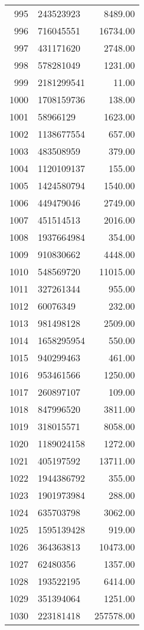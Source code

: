 \begin{table}[ht]
\begin{tabular}{rlr}
  995 & 243523923 & 8489.00 \\ 
  996 & 716045551 & 16734.00 \\ 
  997 & 431171620 & 2748.00 \\ 
  998 & 578281049 & 1231.00 \\ 
  999 & 2181299541 & 11.00 \\ 
  1000 & 1708159736 & 138.00 \\ 
  1001 & 58966129 & 1623.00 \\ 
  1002 & 1138677554 & 657.00 \\ 
  1003 & 483508959 & 379.00 \\ 
  1004 & 1120109137 & 155.00 \\ 
  1005 & 1424580794 & 1540.00 \\ 
  1006 & 449479046 & 2749.00 \\ 
  1007 & 451514513 & 2016.00 \\ 
  1008 & 1937664984 & 354.00 \\ 
  1009 & 910830662 & 4448.00 \\ 
  1010 & 548569720 & 11015.00 \\ 
  1011 & 327261344 & 955.00 \\ 
  1012 & 60076349 & 232.00 \\ 
  1013 & 981498128 & 2509.00 \\ 
  1014 & 1658295954 & 550.00 \\ 
  1015 & 940299463 & 461.00 \\ 
  1016 & 953461566 & 1250.00 \\ 
  1017 & 260897107 & 109.00 \\ 
  1018 & 847996520 & 3811.00 \\ 
  1019 & 318015571 & 8058.00 \\ 
  1020 & 1189024158 & 1272.00 \\ 
  1021 & 405197592 & 13711.00 \\ 
  1022 & 1944386792 & 355.00 \\ 
  1023 & 1901973984 & 288.00 \\ 
  1024 & 635703798 & 3062.00 \\ 
  1025 & 1595139428 & 919.00 \\ 
  1026 & 364363813 & 10473.00 \\ 
  1027 & 62480356 & 1357.00 \\ 
  1028 & 193522195 & 6414.00 \\ 
  1029 & 351394064 & 1251.00 \\ 
  1030 & 223181418 & 257578.00 \\ 

\end{tabular}
\end{table}
